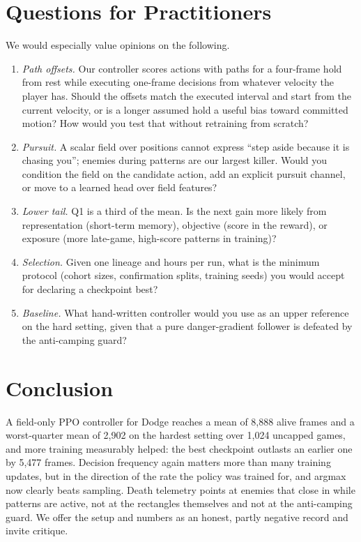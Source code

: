 \documentclass[journal]{IEEEtran}
\begin{document}
\section{Questions for Practitioners}\label{sec:questions}
We would especially value opinions on the following.
\begin{enumerate}
\item \emph{Path offsets.} Our controller scores actions with paths for a
  four-frame hold from rest while executing one-frame decisions from whatever
  velocity the player has. Should the offsets match the executed interval and
  start from the current velocity, or is a longer assumed hold a useful bias
  toward committed motion? How would you test that without retraining from
  scratch?
\item \emph{Pursuit.} A scalar field over positions cannot express ``step
  aside because it is chasing you''; enemies during patterns are our largest
  killer. Would you condition the field on the candidate action, add an
  explicit pursuit channel, or move to a learned head over field features?
\item \emph{Lower tail.} Q1 is a third of the mean. Is the next gain more likely
  from representation (short-term memory), objective (score in the reward),
  or exposure (more late-game, high-score patterns in training)?
\item \emph{Selection.} Given one lineage and hours per run, what is the
  minimum protocol (cohort sizes, confirmation splits, training seeds) you
  would accept for declaring a checkpoint best?
\item \emph{Baseline.} What hand-written controller would you use as an upper
  reference on the hard setting, given that a pure danger-gradient follower
  is defeated by the anti-camping guard?
\end{enumerate}

\section{Conclusion}
A field-only PPO controller for Dodge reaches a mean of 8,888 alive frames
and a worst-quarter mean of 2,902 on the hardest setting over 1,024 uncapped
games, and more training measurably helped: the best checkpoint outlasts an
earlier one by 5,477 frames. Decision frequency again matters more than many
training updates, but in the direction of the rate the policy was trained
for, and argmax now clearly beats sampling. Death telemetry points at enemies
that close in while patterns are active, not at the rectangles themselves and
not at the anti-camping guard. We offer the
setup and numbers as an honest, partly negative record and invite critique.
\end{document}
